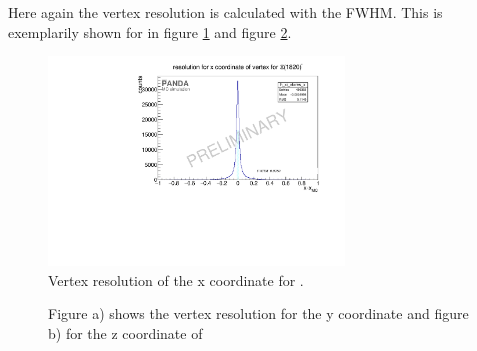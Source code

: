 	Here again the vertex resolution is calculated with the FWHM. 
	This is exemplarily shown for \excitedcascade in figure \ref{fig:Xi1820_vtxx} and figure \ref{fig:Xi1820_vtxyz}.
	
	\begin{figure}
		\centering
		\includegraphics[width=0.7\textwidth]{./plots/Xi1820/XiMinus1820_vtxres_x.pdf}
		\caption{Vertex resolution of the x coordinate for \excitedcascade.}
		\label{fig:Xi1820_vtxx}
	\end{figure}
	
	 \begin{figure}
		\centering
		\caption{Figure a) shows the vertex resolution for the y coordinate and figure b) for the z coordinate of \excitedcascade}
		\label{fig:Xi1820_vtxyz}
	\end{figure}
	
